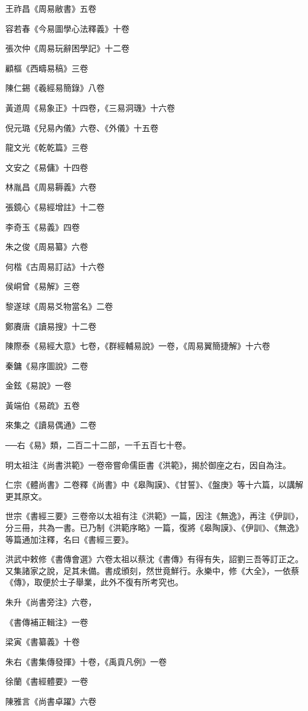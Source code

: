 王祚昌《周易敝書》五卷

容若春《今易圖學心法釋義》十卷

張次仲《周易玩辭困學記》十二卷

顧樞《西疇易稿》三卷

陳仁錫《羲經易簡錄》八卷

黃道周《易象正》十四卷，《三易洞璣》十六卷

倪元璐《兒易內儀》六卷、《外儀》十五卷

龍文光《乾乾篇》三卷

文安之《易傭》十四卷

林胤昌《周易耨義》六卷

張鏡心《易經增註》十二卷

李奇玉《易義》四卷

朱之俊《周易纂》六卷

何楷《古周易訂詁》十六卷

侯峒曾《易解》三卷

黎遂球《周易爻物當名》二卷

鄭賡唐《讀易搜》十二卷

陳際泰《易經大意》七卷，《群經輔易說》一卷，《周易翼簡捷解》十六卷

秦鏞《易序圖說》二卷

金鉉《易說》一卷

黃端伯《易疏》五卷

來集之《讀易偶通》二卷

──右《易》類，二百二十二部，一千五百七十卷。

明太祖注《尚書洪範》一卷帝嘗命儒臣書《洪範》，揭於御座之右，因自為注。

仁宗《體尚書》二卷釋《尚書》中《皋陶謨》、《甘誓》、《盤庚》等十六篇，以講解更其原文。

世宗《書經三要》三卷帝以太祖有注《洪範》一篇，因注《無逸》，再注《伊訓》，分三冊，共為一書。已乃制《洪範序略》一篇，復將《皋陶謨》、《伊訓》、《無逸》等篇通加注釋，名曰《書經三要》。

洪武中敕修《書傳會選》六卷太祖以蔡沈《書傳》有得有失，詔劉三吾等訂正之。又集諸家之說，足其未備。書成頒刻，然世竟鮮行。永樂中，修《大全》，一依蔡《傳》，取便於士子舉業，此外不復有所考究也。

朱升《尚書旁注》六卷，

《書傳補正輯注》一卷

梁寅《書纂義》十卷

朱右《書集傳發揮》十卷，《禹貢凡例》一卷

徐蘭《書經體要》一卷

陳雅言《尚書卓躍》六卷

